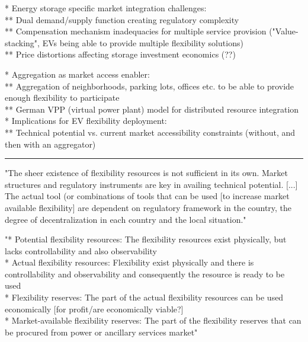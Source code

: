 * Energy storage specific market integration challenges: \\
** Dual demand/supply function creating regulatory complexity \\
** Compensation mechanism inadequacies for multiple service provision ("Value-stacking", EVs being able to provide multiple flexibility solutions) \\
** Price distortions affecting storage investment economics (??)

* Aggregation as market access enabler: \\
** Aggregation of neighborhoods, parking lots, offices etc. to be able to provide enough flexibility to participate \\
** German VPP (virtual power plant) model for distributed resource integration \\

* Implications for EV flexibility deployment: \\
** Technical potential vs. current market accessibility constraints (without, and then with an aggregator) \\


\hrule

"The sheer existence of flexibility resources is not sufficient in its own. Market structures and regulatory instruments are key in availing technical potential. [...] The actual tool (or combinations of tools that can be used [to increase market available flexibility] are dependent on regulatory framework in the country, the degree of decentralization in each country and the local situation." \cite{degefa_comprehensive_2021}

"* Potential flexibility resources: The flexibility resources exist physically, but lacks controllability and also observability \\
* Actual flexibility resources: Flexibility exist physically and there is controllability and observability and consequently the resource is ready to be used \\
* Flexibility reserves: The part of the actual flexibility resources can be used economically [for profit/are economically viable?] \\
* Market-available flexibility reserves: The part of the flexibility reserves that can be procured from power or ancillary services market" \cite{degefa_comprehensive_2021}

